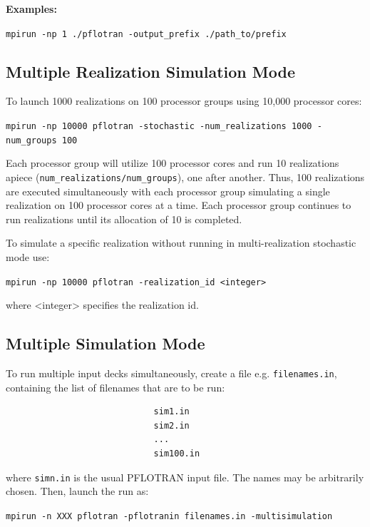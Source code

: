 {\begin{mdframed}
\textbf{Examples:}

\verb|mpirun -np 1 ./pflotran -output_prefix ./path_to/prefix|\\
\end{mdframed}


\subsection{Multiple Realization Simulation Mode}

To launch 1000 realizations on 100 processor groups using 10,000 processor cores:

\noindent
\texttt{mpirun -np 10000 pflotran -stochastic -num\_realizations 1000 \linebreak 
-num\_groups 100}

\noindent
Each processor group will utilize 100 processor cores and run 10 realizations apiece \linebreak (\texttt{num\_realizations/num\_groups}), one after another. Thus, 100 realizations are executed simultaneously with each processor group simulating a single realization on 100 processor cores at a time. Each processor group continues to run realizations until its allocation of 10 is completed.

\noindent
To simulate a specific realization without running in multi-realization stochastic mode use:

\texttt{mpirun -np 10000 pflotran -realization\_id <integer>}

\noindent
where <integer> specifies the realization id.

\subsection{Multiple Simulation Mode}

To run multiple input decks simultaneously, create a file e.g. \texttt{filenames.in}, containing the list of filenames that are to be run:
\begin{Verbatim}
                             sim1.in
                             sim2.in
                             ...
                             sim100.in
\end{Verbatim}
where \texttt{simn.in} is the usual PFLOTRAN input file. The names may be arbitrarily chosen. Then, launch the run as:

\verb|mpirun -n XXX pflotran -pflotranin filenames.in -multisimulation| 

}
